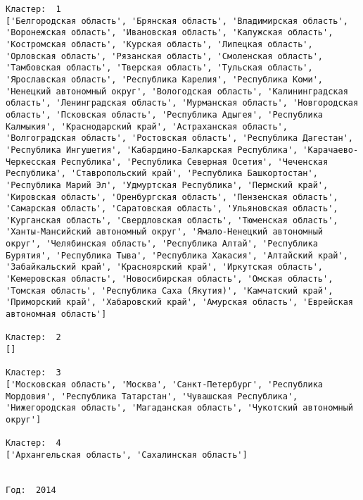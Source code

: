 \documentclass[11pt]{article}
\begin{document}
\begin{Verbatim}[commandchars=\\\{\}]
Кластер:  1
['Белгородская область', 'Брянская область', 'Владимирская область', 'Воронежская область', 'Ивановская область', 'Калужская область', 'Костромская область', 'Курская область', 'Липецкая область', 'Орловская область', 'Рязанская область', 'Смоленская область', 'Тамбовская область', 'Тверская область', 'Тульская область', 'Ярославская область', 'Республика Карелия', 'Республика Коми', 'Ненецкий автономный округ', 'Вологодская область', 'Калинингpадская область', 'Ленинградская область', 'Мурманская область', 'Новгородская область', 'Псковская область', 'Республика Адыгея', 'Республика Калмыкия', 'Краснодарский край', 'Астраханская область', 'Волгоградская область', 'Ростовская область', 'Республика Дагестан', 'Республика Ингушетия', 'Кабардино-Балкарская Республика', 'Карачаево-Черкесская Республика', 'Республика Северная Осетия', 'Чеченская Республика', 'Ставропольский край', 'Республика Башкортостан', 'Республика Марий Эл', 'Удмуртская Республика', 'Пермский край', 'Кировская область', 'Оренбургская область', 'Пензенская область', 'Самарская область', 'Саратовская область', 'Ульяновская область', 'Курганская область', 'Свердловская область', 'Тюменская область', 'Ханты-Мансийский автономный округ', 'Ямало-Ненецкий автономный округ', 'Челябинская область', 'Республика Алтай', 'Республика Бурятия', 'Республика Тыва', 'Республика Хакасия', 'Алтайский край', 'Забайкальский край', 'Красноярский край', 'Иркутская область', 'Кемеровская область', 'Новосибирская область', 'Омская область', 'Томская область', 'Республика Саха (Якутия)', 'Камчатский край', 'Приморский край', 'Хабаровский край', 'Амурская область', 'Еврейская автономная область']

Кластер:  2
[]

Кластер:  3
['Московская область', 'Москва', 'Санкт-Петербург', 'Республика Мордовия', 'Республика Татарстан', 'Чувашская Республика', 'Нижегородская область', 'Магаданская область', 'Чукотский автономный округ']

Кластер:  4
['Архангельская область', 'Сахалинская область']


Год:  2014


\end{Verbatim}
\end{document}
